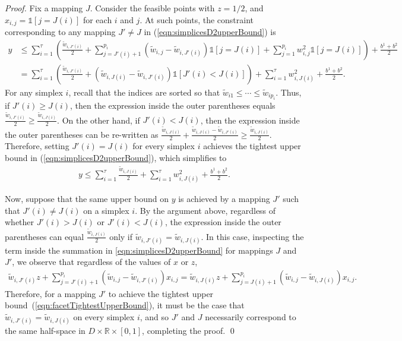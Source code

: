 \documentclass[smallextended]{svjour3}
\newcommand{\bbone}{\mathbb{1}}
\newcommand{\tw}{\widetilde{w}}
\begin{document}
\begin{proof}
Fix a mapping $J$.  Consider the feasible points with $z=1/2$, and $x_{i,j}= \bbone[j = J(i)]$ for each $i$ and $j$.
At such points, the constraint corresponding to any mapping $J' \neq J$ in (\ref{eqn:simplicesD2upperBound}) is
\begin{align*}
y &\le\sum_{i=1}^{\tau}\left(\frac{\tw_{i,J'(i)}}{2}+\sum_{j=J'(i)+1}^{p_i}(\tw_{i,j}-\tw_{i,J'(i)})\mathbb{1}[j=J(i)]+\sum_{j=1}^{p_i}w^2_{i,j}\mathbb{1}[j=J(i)]\right)+\frac{b^1+b^2}{2} \\
&=\sum_{i=1}^{\tau}\left(\frac{\tw_{i,J'(i)}}{2}+(\tw_{i,J(i)}-\tw_{i,J'(i)})\mathbb{1}[J'(i)<J(i)]\right)+\sum_{i=1}^{\tau}w^2_{i,J(i)}+\frac{b^1+b^2}{2}.
\end{align*}
For any simplex $i$, recall that the indices are sorted so that $\tw_{i1}\le\cdots\le\tw_{ip_i}$.
Thus, if $J'(i)\ge J(i)$, then the expression inside the outer parentheses equals $\frac{\tw_{i,J'(i)}}{2} \geq \frac{\tw_{i,J(i)}}{2}$.
On the other hand, if $J'(i)<J(i)$, then the expression inside the outer parentheses can be re-written as $\frac{\tw_{i,J(i)}}{2}+\frac{\tw_{i,J(i)}-\tw_{i,J'(i)}}{2} \geq \frac{\tw_{i,J(i)}}{2}$.
Therefore, setting $J'(i)=J(i)$ for every simplex $i$ achieves the tightest upper bound in (\ref{eqn:simplicesD2upperBound}), which simplifies to
\begin{align} \label{eqn:facetTightestUpperBound}
y\le\sum_{i=1}^{\tau}\frac{\tw_{i,J(i)}}{2}+\sum_{i=1}^{\tau}w^2_{i,J(i)}+\frac{b^1+b^2}{2}.
\end{align}

Now, suppose that the same upper bound on $y$ is achieved by a mapping $J'$ such that $J'(i)\neq J(i)$ on a simplex $i$.
By the argument above, regardless of whether $J'(i)>J(i)$ or $J'(i)<J(i)$, the expression inside the outer parentheses can equal $\frac{\tw_{i,J(i)}}{2}$ only if $\tw_{i,J'(i)}=\tw_{i,J(i)}$.
In this case, inspecting the term inside the summation in \eqref{eqn:simplicesD2upperBound} for mappings $J$ and $J'$, we observe that regardless of the values of $x$ or $z$,
\begin{align*}
\tw_{i,J'(i)}z+\sum_{j=J'(i)+1}^{p_i}(\tw_{i,j}-\tw_{i,J'(i)})x_{i,j}=\tw_{i,J(i)}z+\sum_{j=J(i)+1}^{p_i}(\tw_{i,j}-\tw_{i,J(i)})x_{i,j}.
\end{align*}
Therefore, for a mapping $J'$ to achieve the tightest upper bound~(\ref{eqn:facetTightestUpperBound}), it must be the case that $\tw_{i,J'(i)}=\tw_{i,J(i)}$ on every simplex $i$, and so $J'$ and $J$ necessarily correspond to the same half-space in $D\times\mathbb{R}\times[0,1]$, completing the proof.
\qed\end{proof}
\end{document}
